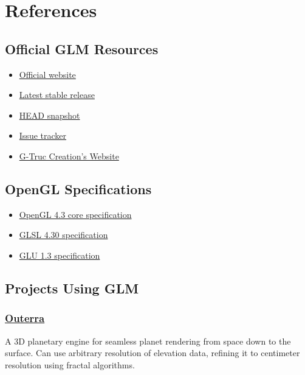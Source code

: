 \documentclass{scrartcl}
\numberwithin{figure}{subsection}
\begin{document}
\newpage{}

\section{References}

\subsection{Official GLM Resources}

\begin{itemize}
  \item \href{http://glm.g-truc.net}{Official website}
  \item \href{https://github.com/g-truc/glm/releases/tag/0.9.7.1}{Latest stable release}
  \item \href{https://github.com/g-truc/glm/archive/master.zip}{HEAD snapshot}
  \item \href{https://github.com/g-truc/glm/issues}{Issue tracker}
  \item \href{http://www.g-truc.net}{G-Truc Creation's Website}
\end{itemize}

\subsection{OpenGL Specifications}

\begin{itemize}
  \item \href{http://www.opengl.org/registry/doc/glspec43.core.20120806.withchanges.pdf}{OpenGL 4.3 core specification}
  \item \href{http://www.opengl.org/registry/doc/GLSLangSpec.4.30.7.diff.pdf}{GLSL 4.30 specification}
  \item \href{http://www.opengl.org/documentation/specs/glu/glu1_3.pdf}{GLU 1.3 specification}
\end{itemize}

\subsection{Projects Using GLM}

\subsubsection{\href{http://outerra.com/}{Outerra}}

A 3D planetary engine for seamless planet rendering from space down to the surface. Can use arbitrary resolution of elevation data, refining it to centimeter resolution using fractal algorithms.
\end{document}
